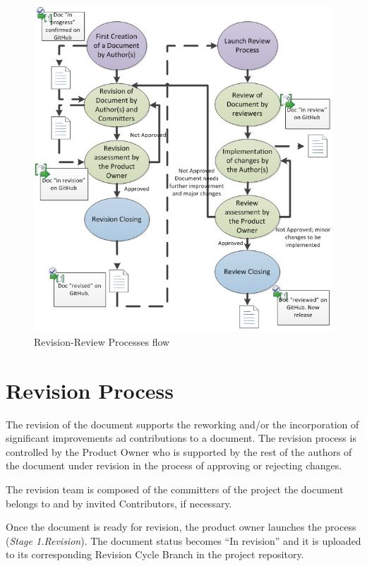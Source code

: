 \documentclass{template/openetcs_article}
\begin{document}
\begin{figure}[H]
\centering
\includegraphics{./figures/RevisionReviewProcess.JPG}
\caption{Revision-Review Processes flow}
\end{figure}

\section{Revision Process}

The revision of the document supports the reworking and/or the incorporation of significant improvements ad contributions to a document. The revision process is controlled by the Product Owner who is supported by the rest of the authors of the document under revision in the process of approving or rejecting changes.

The revision team is composed of the committers of the project the document belongs to and by invited Contributors, if necessary.

Once the document is ready for revision, the product owner launches the process ({\it Stage 1.Revision}). The document status becomes “In revision” and it is uploaded to its corresponding Revision Cycle Branch in the project repository.
\end{document}
